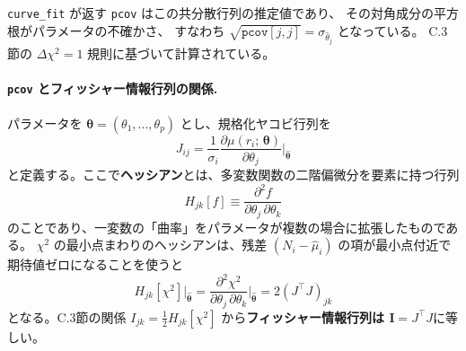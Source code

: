 \documentclass[uplatex,dvipdfmx,12pt,nomag]{jsarticle}
\begin{document}
\texttt{curve\_fit} が返す \texttt{pcov} はこの共分散行列の推定値であり、
その対角成分の平方根がパラメータの不確かさ、
すなわち $\sqrt{\texttt{pcov}[j,j]} = \sigma_{\hat{\theta}_j}$ となっている。
C.3節の $\Delta\chi^2 = 1$ 規則に基づいて計算されている。

\paragraph{\texttt{pcov} とフィッシャー情報行列の関係.}
パラメータを $\bm{\theta} = (\theta_1,\ldots,\theta_p)$ とし、規格化ヤコビ行列を
\begin{equation}
  J_{ij} = \frac{1}{\sigma_i}\frac{\partial\mu(r_i;\,\bm{\theta})}{\partial\theta_j}
  \bigg|_{\hat{\bm{\theta}}}
\end{equation}
と定義する。ここで\textbf{ヘッシアン}とは、多変数関数の二階偏微分を要素に持つ行列
\begin{equation}
  H_{jk}[f] \equiv \frac{\partial^2 f}{\partial\theta_j\,\partial\theta_k}
\end{equation}
のことであり、一変数の「曲率」をパラメータが複数の場合に拡張したものである。
$\chi^2$ の最小点まわりのヘッシアンは、残差 $(N_i - \hat{\mu}_i)$ の項が最小点付近で
期待値ゼロになることを使うと
\begin{equation}
  H_{jk}[\chi^2]\big|_{\hat{\bm{\theta}}}
  = \frac{\partial^2\chi^2}{\partial\theta_j\,\partial\theta_k}\bigg|_{\hat{\bm{\theta}}}
  = 2(J^\top J)_{jk}
\end{equation}
となる。C.3節の関係 $I_{jk} = \tfrac{1}{2}H_{jk}[\chi^2]$
から\textbf{フィッシャー情報行列は $\bm{I} = J^\top J$}に等しい。
\end{document}

